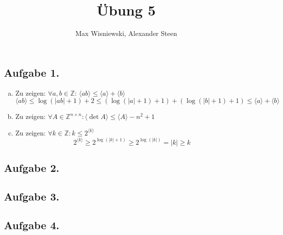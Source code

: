 \documentclass[11pt,a4paper,ngerman]{article}
\date{}
\title{Übung 5}
\author{Max Wisniewski, Alexander Steen}
\newcommand{\code}[1]{\langle {#1} \rangle}
\newcommand{\Z}{\mathbb{Z}}
\begin{document}

\renewcommand{\figurename}{Figure}

\maketitle
\thispagestyle{fancy}

\subsection*{Aufgabe 1.}
\begin{enumerate}[a)]
\item Zu zeigen: $\forall a,b \in \Z: \, \code{ab} \leq \code{a} + \code{b}$ 
\begin{equation*}
 \code{ab} \leq \log(|ab| + 1)+2 \leq (\log(|a|+1)+1) + (\log(|b|+1)+1) \leq \code{a} + \code{b}
\end{equation*}
\item Zu zeigen: $\forall A \in \Z^{n \times n}: \code{\det A} \leq \code{A} - n^2 + 1$ \\
\item Zu zeigen: $\forall k \in \Z: k \leq 2^{\code{k}}$ \\
\begin{equation*}
2^{\code{k}} \geq 2^{\log(|k| + 1)} \geq 2^{\log(|k|)} = |k| \geq k
\end{equation*}
\end{enumerate}
\subsection*{Aufgabe 2.}
\subsection*{Aufgabe 3.}
\subsection*{Aufgabe 4.}


\label{LastPage}
\end{document}
